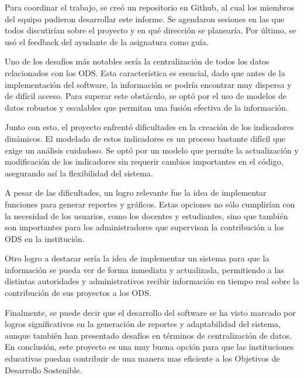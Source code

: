 \documentclass[12pt]{article}
\begin{document}
Para coordinar el trabajo, se creó un repositorio en Github, al cual los miembros del equipo pudieron desarrollar este informe. Se agendaron sesiones en las que todos discutirían sobre el proyecto y en qué dirección se planearía. Por último, se usó el feedback del ayudante de la asignatura como guía.

Uno de los desafíos más notables sería la centralización de todos los datos relacionados con los ODS. Esta característica es esencial, dado que antes de la implementación del software, la información se podría encontrar muy dispersa y de difícil acceso. Para superar este obstáculo, se optó por el uso de modelos de datos robustos y escalables que permitan una fusión efectiva de la información.

Junto con esto, el proyecto enfrentó dificultades en la creación de los indicadores dinámicos. El modelado de estos indicadores es un proceso bastante difícil que exige un análisis cuidadoso. Se optó por un modelo que permite la actualización y modificación de los indicadores sin requerir cambios importantes en el código, asegurando así la flexibilidad del sistema.

A pesar de las dificultades, un logro relevante fue la idea de implementar funciones para generar reportes y gráficos. Estas opciones no sólo cumplirían con la necesidad de los usuarios, como los docentes y estudiantes, sino que también son importantes para los administradores que supervisan la contribución a los ODS en la institución.

Otro logro a destacar sería la idea de implementar un sistema para que la información se pueda ver de forma inmediata y actualizada, permitiendo a las distintas autoridades y administrativos recibir información en tiempo real sobre la contribución de sus proyectos a los ODS.

Finalmente, se puede decir que el desarrollo del software se ha visto marcado por logros significativos en la generación de reportes y adaptabilidad del sistema, aunque también han presentado desafíos en términos de centralización de datos. En conclusión, este proyecto es una muy buena opción para que las instituciones educativas puedan contribuir de una manera mas eficiente a los Objetivos de Desarrollo Sostenible.
\end{document}

